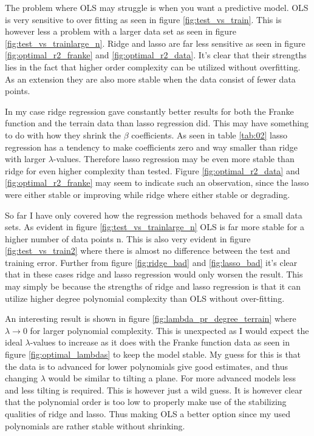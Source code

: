\documentclass[uio,jmp,amsmath,amssymb,reprint,nofootinbib]{revtex4-1}
\numberwithin{equation}{section}
\begin{document}
The problem where OLS may struggle is when you want a predictive model. OLS is very sensitive to over fitting as seen in figure \ref{fig:test_vs_train}. This is however less a problem with a larger data set as seen in figure \ref{fig:test_vs_trainlarge_n}. Ridge and lasso are far less sensitive as seen in figure \ref{fig:optimal_r2_franke} and \ref{fig:optimal_r2_data}. It's clear that their strengths lies in the fact that higher order complexity can be utilized without overfitting. As an extension they are also more stable when the data consist of fewer data points. 

In my case ridge regression gave constantly better results for both the Franke function and the terrain data than lasso regression did. This may have something to do with how they shrink the \(\beta\) coefficients. As seen in table \ref{tab:02} lasso regression has a tendency to make coefficients zero and way smaller than ridge with larger \(\lambda\)-values. Therefore lasso regression may be even more stable than ridge for even higher complexity than tested. Figure \ref{fig:optimal_r2_data} and \ref{fig:optimal_r2_franke} may seem to indicate such an observation, since the lasso were either stable or improving while ridge where either stable or degrading.

So far I have only covered how the regression methods behaved for a small data sets. As evident in figure \ref{fig:test_vs_trainlarge_n} OLS is far more stable for a higher number of data points n. This is also very evident in figure \ref{fig:test_vs_train2} where there is almost no difference between the test and training error. Further from figure \ref{fig:ridge_bad} and \ref{fig:lasso_bad} it's clear that in these cases ridge and lasso regression would only worsen the result. This may simply be because the strengths of ridge and lasso regression is that it can utilize higher degree polynomial complexity than OLS without over-fitting. 

An interesting result is shown in figure \ref{fig:lambda_pr_degree_terrain} where \(\lambda \rightarrow 0\) for larger polynomial complexity. This is unexpected as I would expect the ideal \(\lambda\)-values to increase as it does with the Franke function data as seen in figure \ref{fig:optimal_lambdas} to keep the model stable. My guess for this is that the data is to advanced for lower polynomials give good estimates, and thus changing \(\lambda\) would be similar to tilting a plane. For more advanced models less and less tilting is required. This is however just a wild guess. It is however clear that the polynomial order is too low to properly make use of the stabilizing qualities of ridge and lasso. Thus making OLS a better option since my used polynomials are rather stable without shrinking.
\end{document}
